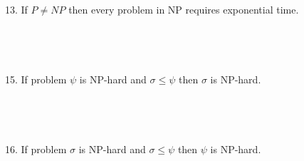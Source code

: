  
13. If $P \ne NP$ then every problem in NP requires exponential time.\\\\\\\\\\
15. If problem $\psi$ is NP-hard and $\sigma \le \psi$ then $\sigma$ is NP-hard.\\\\\\\\\\
16. If problem $\sigma$ is NP-hard and $\sigma \le \psi$ then $\psi$ is NP-hard.